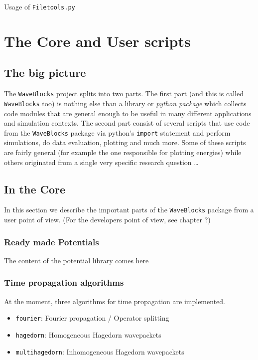 \documentclass[a4paper,10pt]{report}
\begin{document}
Usage of \texttt{Filetools.py}









\chapter{The Core and User scripts}

\section{The big picture}

The \texttt{WaveBlocks} project splits into two parts. The first part (and this
is called \texttt{WaveBlocks} too) is nothing else than a library or \emph{python package}
which collects code modules that are general enough to be useful in many different applications
and simulation contexts. The second part consist of several scripts that use code
from the \texttt{WaveBlocks} package via python's \texttt{import} statement and
perform simulations, do data evaluation, plotting and much more. Some of these
scripts are fairly general (for example the one responsible for plotting energies)
while others originated from a single very specific research question \ldots

\section{In the Core}

In this section we describe the important parts of the \texttt{WaveBlocks} package
from a user point of view. (For the developers point of view, see chapter ?)

\subsection{Ready made Potentials}

The content of the potential library comes here

\subsection{Time propagation algorithms}

At the moment, three algorithms for time propagation are implemented.

\begin{itemize}
  \item \texttt{fourier}: Fourier propagation / Operator splitting
  \item \texttt{hagedorn}: Homogeneous Hagedorn wavepackets
  \item \texttt{multihagedorn}: Inhomogeneous Hagedorn wavepackets
\end{itemize}
\end{document}
